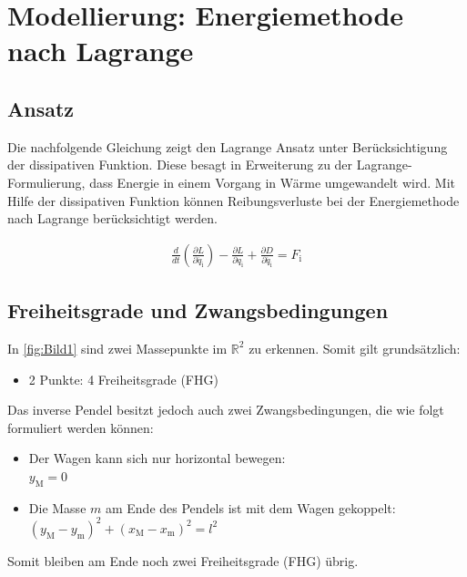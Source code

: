 \documentclass[
	pagesize,
	fontsize=12pt,
	paper=a4,
	oneside,
   reqno
]{scrartcl}
\begin{document}
\clearpage

\section{Modellierung: Energiemethode nach Lagrange}

\subsection{Ansatz}

Die nachfolgende Gleichung zeigt den Lagrange Ansatz unter Berücksichtigung der dissipativen Funktion. Diese besagt in Erweiterung zu der Lagrange-Formulierung, dass Energie in einem Vorgang in Wärme umgewandelt wird. Mit Hilfe der dissipativen Funktion können Reibungsverluste bei der Energiemethode nach Lagrange berücksichtigt werden.

\begin{align} \label{eq:Gleichung1}
    \frac{d}{dt} \left(\frac{\partial L}{\partial \dot{q_{\mathrm{i}}}}\right) - \frac{\partial L}{\partial q_{\mathrm{i}}} + \frac{\partial D}{\partial \dot{q_{\mathrm{i}}}} = F_{\mathrm{i}}
\end{align}

\subsection{Freiheitsgrade und Zwangsbedingungen}

In \autoref{fig:Bild1} sind zwei Massepunkte im $\mathbb{R}^2$ zu erkennen. Somit gilt grundsätzlich:
\begin{itemize}
    \item 2 Punkte: 4 Freiheitsgrade (FHG)
\end{itemize}

Das inverse Pendel besitzt jedoch auch zwei Zwangsbedingungen, die wie folgt formuliert werden können:

\begin{itemize}
    \item Der Wagen kann sich nur horizontal bewegen: \\ $y_{\mathrm{M}} = 0$
    \item Die Masse $m$ am Ende des Pendels ist mit dem Wagen gekoppelt: \\ $(y_{\mathrm{M}} - y_{\mathrm{m}})^2 + (x_{\mathrm{M}} - x_{\mathrm{m}})^2 = l^2$
\end{itemize}

Somit bleiben am Ende noch zwei Freiheitsgrade (FHG) übrig.
\end{document}
